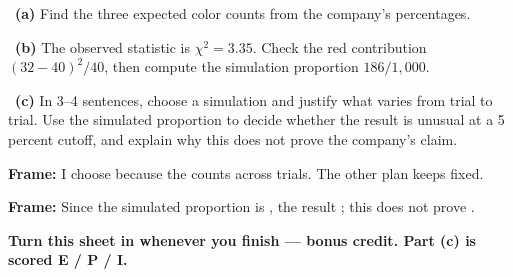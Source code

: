 \documentclass[11pt]{article}
\begin{document}
~\textbf{(a)} Find the three expected color counts from the company's percentages.\par
\workspace{0.7in}

~\textbf{(b)} The observed statistic is $\chi^2=3.35$. Check the red contribution $(32-40)^2/40$, then compute the simulation proportion $186/1{,}000$.\par
\workspace{1.4in}

~\textbf{(c)} In 3--4 sentences, choose a simulation and justify what varies from trial to trial. Use the simulated proportion to decide whether the result is unusual at a 5 percent cutoff, and explain why this does not prove the company's claim.\par
\workspace{2.0in}

\begin{sentenceframebox}\raggedright\textbf{Frame:} I choose \blank[1.1in] because the counts \blank[1.8in] across trials. The other plan keeps \blank[1.8in] fixed.\end{sentenceframebox}

\begin{sentenceframebox}\raggedright\textbf{Frame:} Since the simulated proportion is \blank[0.8in], the result \blank[1.8in]; this does not prove \blank[1.8in].\end{sentenceframebox}

\textbf{Turn this sheet in whenever you finish --- bonus credit. Part (c) is scored E / P / I.}\par
\end{document}
